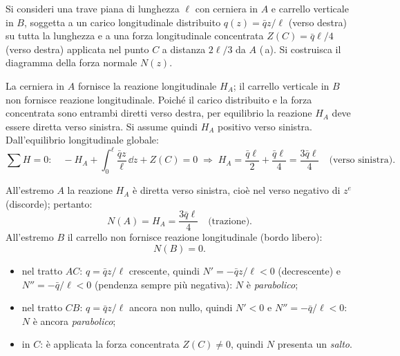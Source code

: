 \begin{esempio}
	Si consideri una trave piana di lunghezza $\ell$ con cerniera in $A$
	e carrello verticale in $B$, soggetta a un carico longitudinale
	distribuito $q(z) = \bar{q}z/\ell$ (verso destra) su tutta la
	lunghezza e a una forza longitudinale concentrata
	$Z(C) = \bar{q}\ell/4$ (verso destra) applicata nel punto $C$
	a distanza $2\ell/3$ da $A$ (\,a).
	Si costruisca il diagramma della forza normale $N(z)$.
	
	\begin{svolgimento}
		
		
		



		
		
		La cerniera in $A$ fornisce la reazione longitudinale $H_A$;
		il carrello verticale in $B$ non fornisce reazione longitudinale.
		Poiché il carico distribuito e la forza concentrata sono entrambi
		diretti verso destra, per equilibrio la reazione $H_A$ deve essere
		diretta verso sinistra.
		Si assume quindi $H_A$ positivo verso sinistra.
		Dall'equilibrio longitudinale globale:
		\[
		\sum H = 0:\quad
		-H_A + \int_0^\ell \frac{\bar{q}z}{\ell}\,\dd z + Z(C) = 0
		\;\Rightarrow\;
		H_A = \frac{\bar{q}\ell}{2} + \frac{\bar{q}\ell}{4}
		= \frac{3\bar{q}\ell}{4} \quad\text{(verso sinistra)}.
		\]
		
		All'estremo $A$ la reazione $H_A$ è diretta verso sinistra,
		cioè nel verso negativo di $z^e$ (discorde); pertanto:
		\[
		N(A) = H_A = \frac{3\bar{q}\ell}{4} \quad\text{(trazione)}.
		\]
		All'estremo $B$ il carrello non fornisce reazione longitudinale
		(bordo libero):
		\[
		N(B) = 0.
		\]
		
		\begin{itemize}[nosep]
			\item nel tratto $AC$: $q = \bar{q}z/\ell$ crescente,
			quindi $N' = -\bar{q}z/\ell < 0$ (decrescente)
			e $N'' = -\bar{q}/\ell < 0$ (pendenza sempre
			più negativa): $N$ è \emph{parabolico};
			\item nel tratto $CB$: $q = \bar{q}z/\ell$ ancora
			non nullo, quindi $N' < 0$ e
			$N'' = -\bar{q}/\ell < 0$: $N$ è ancora
			\emph{parabolico};
			\item in $C$: è applicata la forza concentrata
			$Z(C)\neq 0$, quindi $N$ presenta un
			\emph{salto}.
		\end{itemize}
		

\end{svolgimento}
\end{esempio}
